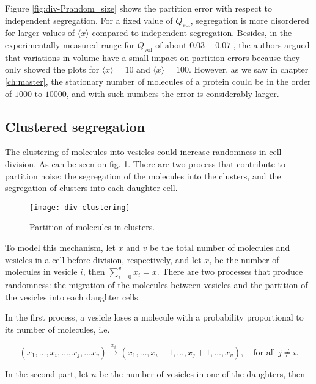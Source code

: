 Figure \ref{fig:div-Prandom_size} shows the partition error with respect to independent segregation. For a fixed value of $Q_\text{vol}$, segregation is more disordered for larger values of $\langle x\rangle$ compared to independent segregation. Besides, in the experimentally measured range for $Q_\text{vol}$ of about $0.03 - 0.07$ \cite{huh11b}, the authors argued that variations in volume have a small impact on partition errors because they only showed the plots for $\langle x\rangle = 10$ and $\langle x\rangle = 100$. However, as we saw in chapter \ref{ch:master}, the stationary number of molecules of a protein could be in the order of $1000$ to $10000$, and with such numbers the error is considerably larger.

\subsection{Clustered segregation}

The clustering of molecules into vesicles could increase randomness in cell division. As can be seen on fig. \ref{fig:div-clustering}. There are two process that contribute to partition noise: the segregation of the molecules into the clusters, and the segregation of clusters into each daughter cell.

\begin{figure}[H]
  \centering
  \texttt{[image: div-clustering]}
  \caption[Partition of molecules in clusters]{\label{fig:div-clustering} Partition of molecules in clusters.}
\end{figure}

To model this mechanism, let $x$ and $v$ be the total number of molecules and vesicles in a cell before division, respectively, and let $x_i$ be the number of molecules in vesicle $i$, then $\sum_{i=0}^vx_i=x$. There are two processes that produce randomness: the migration of the molecules between vesicles and the partition of the vesicles into each daughter cells.

In the first process, a vesicle loses a molecule with a probability proportional to its number of molecules, i.e.

\begin{equation}
  \label{eq:div-vesicle_switch}
  (x_1,\dotsc,x_i,\dotsc,x_j,\dotsc x_v) \xrightarrow{x_i} (x_1,\dotsc,x_i-1,\dotsc,x_j+1,\dotsc, x_v),\quad \text{for all } j\neq i.
\end{equation}

In the second part, let $n$ be the number of vesicles in one of the daughters, then

